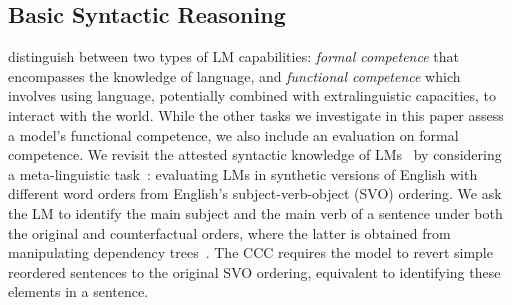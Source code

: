 \subsection{Basic Syntactic Reasoning}

\citet{mahowald2023dissociating} distinguish between two types of LM capabilities: \emph{formal competence} that encompasses the knowledge of language, and \emph{functional competence} which involves using language, potentially combined with extralinguistic capacities, to interact with the world. While the other tasks we investigate in this paper assess a model's functional competence,
we also include an evaluation on formal competence. %
We revisit the attested syntactic knowledge of LMs~ by considering a meta-linguistic task~: evaluating LMs in synthetic versions of English with  
different word orders from English's subject-verb-object (SVO) ordering. We ask the LM to identify the main subject and the main verb of a sentence under both the original and counterfactual orders, where the latter is obtained from manipulating dependency trees~\citep{ravfogel2019studying}. 
The CCC requires the model to revert simple reordered sentences to the original SVO ordering, equivalent to identifying these elements in a sentence.
